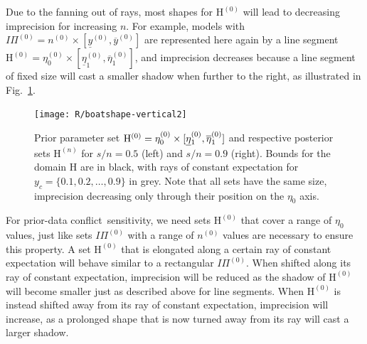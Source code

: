 \documentclass[runningheads,a4paper]{llncs}
\def\pdc{prior-data conflict}
\newcommand{\uz}{^{(0)}} %
\newcommand{\un}{^{(n)}} %
\newcommand{\ul}[1]{\underline{#1}}
\newcommand{\ol}[1]{\overline{#1}}
\def\yzl{\ul{y}\uz}
\def\yzu{\ol{y}\uz}
\def\nz{n\uz}
\def\PZ{I\!\!\Pi\uz}
\def\Eta{\mathrm{H}}
\def\EZ{\mathrm{H}\uz}
\def\EN{\mathrm{H}\un}
\def\ezz{\eta_0\uz}
\def\ezn{\eta_0\un}
\def\eozl{\ul{\eta}_1\uz}
\def\eozu{\ol{\eta}_1\uz}
\def\eonl{\ul{\eta}_1\un}
\def\eonu{\ol{\eta}_1\un}
\begin{document}
Due to the fanning out of rays, most shapes for $\EZ$ will lead to decreasing imprecision for increasing $n$.
For example, models with $\PZ = \nz \times [\yzl, \yzu]$
are represented here again by a line segment $\EZ = \ezz \times [\eozl,\eozu]$,
and imprecision decreases because a line segment of fixed size
will cast a smaller shadow when further to the right,
as illustrated in Fig.~\ref{fig:boatshape-vertical}.
\begin{figure}  %
\centering
\texttt{[image: R/boatshape-vertical2]}%
\caption[Line segment parameter set $\EZ$ %
and respective posterior sets for $s/n=0.5$ and $s/n=0.9$.]%
{Prior parameter set $\EZ = \ezz \times [\text{\underline{$\eta$}${}_1\uz$},\eozu]$
and respective posterior sets $\EN$ for $s/n=0.5$ (left) and $s/n=0.9$ (right).
Bounds for the domain $\Eta$ are in black, with rays of constant expectation for $y_c = \{0.1,0.2,\ldots,0.9\}$ in grey. 
Note that all sets have the same size, imprecision decreasing only through their position on the $\eta_0$ axis.}
\label{fig:boatshape-vertical}
\end{figure}

For \pdc\ sensitivity, we need sets $\EZ$ that cover a range of $\eta_0$ values,
just like sets $\PZ$ with a range of $\nz$ values are necessary to ensure this property.
A set $\EZ$ that is elongated along a certain ray of constant expectation
will behave similar to a rectangular $\PZ$. %
When shifted along its ray of constant expectation,
imprecision will be reduced as the shadow of $\EZ$ will become smaller just as described above for line segments.
When $\EZ$ is instead shifted away from its ray of constant expectation,
imprecision will increase, as a prolonged shape that is now turned away from its ray 
will cast a larger shadow.
\end{document}
